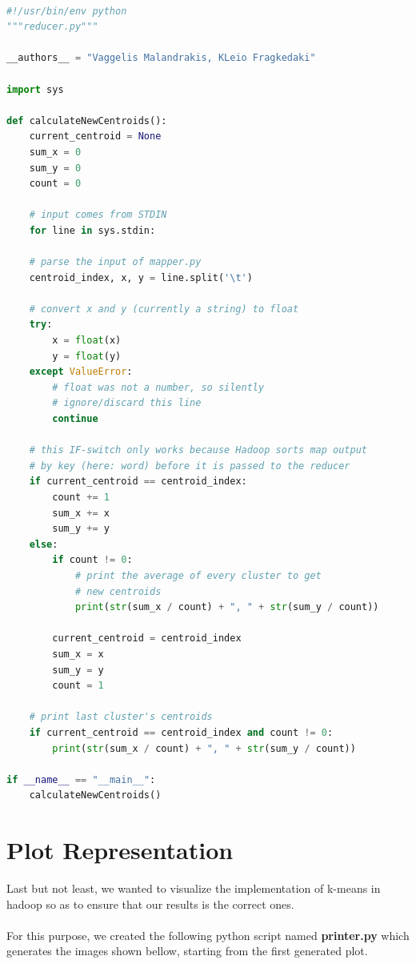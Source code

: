   \HRule \\[0.2cm] %
  
\begin{lstlisting}[language=Python]
#!/usr/bin/env python
"""reducer.py"""

__authors__ = "Vaggelis Malandrakis, KLeio Fragkedaki"

import sys

def calculateNewCentroids():
	current_centroid = None
	sum_x = 0
	sum_y = 0
	count = 0

	# input comes from STDIN
	for line in sys.stdin:
	
	# parse the input of mapper.py
	centroid_index, x, y = line.split('\t')
	
	# convert x and y (currently a string) to float
	try:
		x = float(x)
		y = float(y)
	except ValueError:
		# float was not a number, so silently
		# ignore/discard this line
		continue
	
	# this IF-switch only works because Hadoop sorts map output
	# by key (here: word) before it is passed to the reducer
	if current_centroid == centroid_index:
		count += 1
		sum_x += x
		sum_y += y
	else:
		if count != 0:
			# print the average of every cluster to get  
			# new centroids
			print(str(sum_x / count) + ", " + str(sum_y / count))
		
		current_centroid = centroid_index
		sum_x = x
		sum_y = y
		count = 1
	
	# print last cluster's centroids
	if current_centroid == centroid_index and count != 0:
		print(str(sum_x / count) + ", " + str(sum_y / count))

if __name__ == "__main__":
	calculateNewCentroids()
\end{lstlisting}

\section{Plot Representation}
Last but not least, we wanted to visualize the implementation of k-means in hadoop so as to ensure that our results is the correct ones. \\\\
For this purpose, we created the following python script named \textbf{printer.py} which generates the images shown bellow, starting from the first generated plot.

